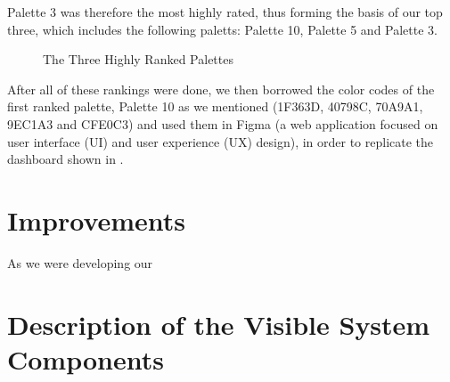 Palette 3 was therefore the most highly rated, thus 
forming the basis of our top three, which includes the 
following paletts: Palette 10, Palette 5 and Palette 3.
\begin{figure}[H]
    \centerline{%
    \hfill
    \hfill
    }
    \caption{The Three Highly Ranked Palettes}
\end{figure} 
After all of these rankings were done, we then borrowed the 
color codes of the first ranked palette, Palette 10 as we mentioned 
(1F363D, 40798C, 70A9A1, 9EC1A3 and CFE0C3) and used them 
in Figma (a web application focused on user interface 
(UI) and user experience (UX) design), in order to replicate 
the dashboard shown in .
\section{Improvements}
As we were developing our
\section{Description of the Visible System Components}